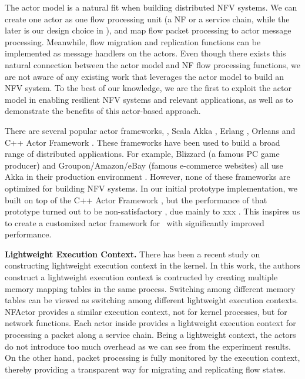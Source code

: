 The actor model is a natural fit when building distributed NFV systems. We can create one actor as one flow processing unit (a NF or a service chain, while the later is our design choice in \nfactor), and map flow packet processing to actor message processing. Meanwhile, flow migration and replication functions can be implemented as message handlers on the actors. Even though there exists this natural connection between the actor model and NF flow processing functions, we are not aware of any existing work that leverages the actor model to build an NFV system. %
 To the best of our knowledge, we are the first to exploit the actor model in enabling resilient NFV systems and relevant applications, as well as to demonstrate the benefits of this actor-based approach.



There are several popular actor frameworks, \eg, Scala Akka \cite{akka}, Erlang \cite{erlang}, Orleans \cite{Orleans} and C++ Actor Framework \cite{caf}. These frameworks have been used to build a broad range of distributed applications. %
 For example, Blizzard (a famous PC game producer) and Groupon/Amazon/eBay (famous e-commerce websites) all use Akka in their production environment \cite{akka}. However, none of these frameworks are optimized for building NFV systems. In our initial prototype implementation, we built \nfactor on top of the C++ Actor Framework \cite{caf}, but the performance of that prototype turned out to be non-satisfactory , due mainly to xxx . This inspires us to create a customized actor framework for \nfactor~with  significantly improved performance. 

\textbf{Lightweight Execution Context.}
There has been a recent study on constructing lightweight execution context \cite{litton2016light} in the kernel. In this work, the authors construct a lightweight execution context is contructed by creating multiple memory mapping tables in the same process. Switching among different memory tables can be viewed as switching among different lightweight execution contexts. NFActor provides a similar execution context, not for kernel processes, but for network functions. Each actor inside \nfactor provides a lightweight execution context for processing a packet along a service chain. Being a lightweight context, the actors do not introduce too much overhead as we can see from the experiment results. On the other hand, packet processing is fully monitored by the execution context, thereby providing a transparent way for migrating and replicating flow states.








